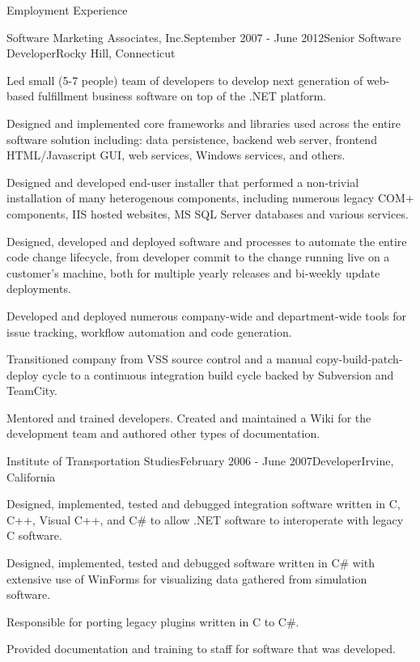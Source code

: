 \documentclass{resume} %
\begin{document}
\begin{rSection}{Employment Experience}
\begin{rSubsection}{Software Marketing Associates, Inc.}{September 2007 - June 2012}{Senior Software Developer}{Rocky Hill, Connecticut}
\item Led small (5-7 people) team of developers to develop next generation of web-based fulfillment business software on top of the .NET platform.
\item Designed and implemented core frameworks and libraries used across the entire software solution including: data persistence, backend web server, frontend HTML/Javascript GUI, web services, Windows services, and others.
\item Designed and developed end-user installer that performed a non-trivial installation of many heterogenous components, including numerous legacy COM+ components, IIS hosted websites, MS SQL Server databases and various services.
\item Designed, developed and deployed software and processes to automate the entire code change lifecycle, from developer commit to the change running live on a customer's machine, both for multiple yearly releases and bi-weekly update deployments.
\item Developed and deployed numerous company-wide and department-wide tools for issue tracking, workflow automation and code generation.
\item Transitioned company from VSS source control and a manual copy-build-patch-deploy cycle to a continuous integration build cycle backed by Subversion and TeamCity.
\item Mentored and trained developers. Created and maintained a Wiki for the development team and authored other types of documentation.
\end{rSubsection}


\begin{rSubsection}{Institute of Transportation Studies}{February 2006 - June 2007}{Developer}{Irvine, California}
\item Designed, implemented, tested and debugged integration software written
in C, C++, Visual C++, and C\# to allow .NET software to interoperate with
legacy C software.
\item Designed, implemented, tested and debugged software written in C\# with
extensive use of WinForms for visualizing data gathered from simulation
software.
\item Responsible for porting legacy plugins written in C to C\#.
\item Provided documentation and training to staff for software that was
developed.
\end{rSubsection}

\end{rSection}
\end{document}
